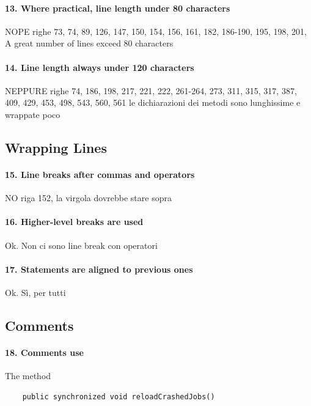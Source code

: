 \documentclass[english]{article}
\begin{document}
\paragraph{13. Where practical, line length under 80 characters}
NOPE
righe 73, 74, 89, 126, 147, 150, 154, 156, 161, 182, 186-190, 195, 198, 201, 
A great number of lines exceed 80 characters

\paragraph{14. Line length always under 120 characters}
NEPPURE
righe 74, 186, 198, 217, 221, 222, 261-264, 273, 311, 315, 317, 387, 409, 429, 453, 498, 543, 560, 561
le dichiarazioni dei metodi sono lunghissime e wrappate poco

\subsection{Wrapping Lines}
\paragraph{15. Line breaks after commas and operators}
NO
riga 152, la virgola dovrebbe stare sopra %

\paragraph{16. Higher-level breaks are used}
Ok.
Non ci sono line break con operatori

\paragraph{17. Statements are aligned to previous ones}
Ok.
Sì, per tutti

\subsection{Comments}

\paragraph{18. Comments use}

The method 

\begin{lstlisting} 
	public synchronized void reloadCrashedJobs() 
\end{lstlisting}
 
\end{document}
